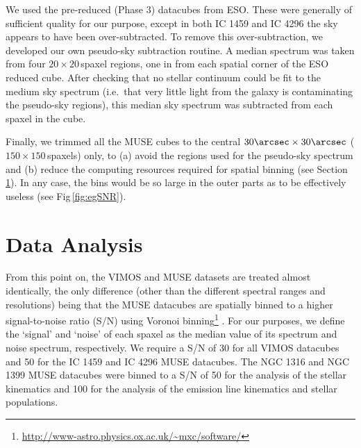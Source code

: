 \documentclass[fleqn,usenatbib,useAMS]{mnras}
\begin{document}
		We used the pre-reduced (Phase 3) datacubes from ESO. These were generally of sufficient quality for our purpose, except in both IC 1459 and IC 4296 the sky appears to have been over-subtracted. To remove this over-subtraction, we developed our own pseudo-sky subtraction routine. A median spectrum was taken from four $20 \times 20$\,spaxel regions, one in from each spatial corner of the ESO reduced cube. After checking that no stellar continuum could be fit to the medium sky spectrum (i.e.\ that very little light from the galaxy is contaminating the pseudo-sky regions), this median sky spectrum was subtracted from each spaxel in the cube. 

		Finally, we trimmed all the MUSE cubes to the central $30\arcsec \times 30\arcsec$ ($150 \times 150$\,spaxels) only, to (a) avoid the regions used for the pseudo-sky spectrum and (b) reduce the computing resources required for spatial binning (see Section \ref{sec:analysis}). In any case, the bins would be so large in the outer parts as to be effectively useless (see Fig\,\ref{fig:egSNR}).

\section{Data Analysis}
	\label{sec:analysis}
	From this point on, the VIMOS and MUSE datasets are treated almost identically, the only difference (other than the different spectral ranges and resolutions) being that the MUSE datacubes are spatially binned to a higher signal-to-noise ratio (S/N) using Voronoi binning\footnote{\url{http://www-astro.physics.ox.ac.uk/~mxc/software/}} \citep{Cappellari2003}. For our purposes, we define the `signal' and `noise' of each spaxel as the median value of its spectrum and noise spectrum, respectively. We require a S/N of 30 for all VIMOS datacubes and 50 for the IC 1459 and IC 4296 MUSE datacubes. The NGC 1316 and NGC 1399 MUSE datacubes were binned to a S/N of 50 for the analysis of the stellar kinematics and 100 for the analysis of the emission line kinematics and stellar populations.

\end{document}

